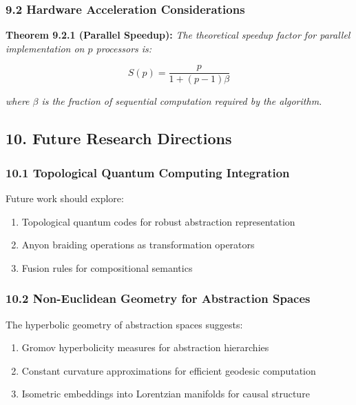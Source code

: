 \documentclass[
]{article}
\providecommand{\tightlist}{%
  \setlength{\itemsep}{0pt}\setlength{\parskip}{0pt}}
\begin{document}
\subsubsection{9.2 Hardware Acceleration
Considerations}\label{hardware-acceleration-considerations}

\textbf{Theorem 9.2.1 (Parallel Speedup):} \emph{The theoretical speedup
factor for parallel implementation on \(p\) processors is:}

\[S(p) = \frac{p}{1 + (p-1)\beta}\]

\emph{where \(\beta\) is the fraction of sequential computation required
by the algorithm.}

\subsection{10. Future Research
Directions}\label{future-research-directions-3}

\subsubsection{10.1 Topological Quantum Computing
Integration}\label{topological-quantum-computing-integration}

Future work should explore:

\begin{enumerate}
\def\labelenumi{\arabic{enumi}.}
\tightlist
\item
  Topological quantum codes for robust abstraction representation
\item
  Anyon braiding operations as transformation operators
\item
  Fusion rules for compositional semantics
\end{enumerate}

\subsubsection{10.2 Non-Euclidean Geometry for Abstraction
Spaces}\label{non-euclidean-geometry-for-abstraction-spaces}

The hyperbolic geometry of abstraction spaces suggests:

\begin{enumerate}
\def\labelenumi{\arabic{enumi}.}
\tightlist
\item
  Gromov hyperbolicity measures for abstraction hierarchies
\item
  Constant curvature approximations for efficient geodesic computation
\item
  Isometric embeddings into Lorentzian manifolds for causal structure
\end{enumerate}
\end{document}
